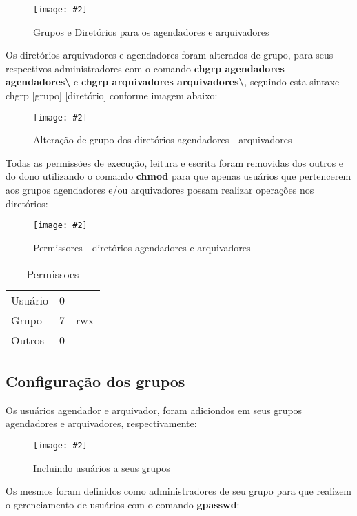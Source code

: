 \documentclass[
	12pt,				%
	openany,			%
	a4paper,			%
	chapter=TITLE,		%
	section=TITLE,		%
	english,
	brazil				%
]{abntex2}
\newcommand{\colcheted}{] }
\newcommand{\colchetee}{[}
\newcommand{\includeImage}[3] {

\begin{figure}[H]
 	 \centering
  		\texttt{[image: \#2]}
  	\caption{#3}
\end{figure}

}
\begin{document}
\includeImage{0.7}{imgs/5_gerenciamento_grupos/diretorios_grupos_arquivadores_agendadores.png}{Grupos e Diretórios para os agendadores e arquivadores}

Os diretórios arquivadores e agendadores foram alterados de grupo, para seus respectivos administradores com o comando \textbf{chgrp agendadores agendadores\textbackslash} e \textbf{chgrp arquivadores arquivadores\textbackslash}, seguindo esta sintaxe chgrp \colchetee grupo\colcheted \colchetee diretório\colcheted conforme imagem abaixo:

\includeImage{0.7}{imgs/5_gerenciamento_grupos/alteracao_de_grupo_dos_diretorios.png}{Alteração de grupo dos diretórios agendadores - arquivadores}

Todas as permissões de execução, leitura e escrita foram removidas dos outros e do dono utilizando o comando \textbf{chmod} para que apenas usuários que pertencerem aos grupos agendadores e/ou arquivadores possam realizar operações nos diretórios:

\includeImage{0.7}{imgs/5_gerenciamento_grupos/permissao_restringida_apenas_para_os_grupos.png}{Permissores - diretórios agendadores e arquivadores}

\begin{table}[h]
\caption{Permissoes}
\centering
\begin{tabular}{r|lr}
\cline{1-3}
\multicolumn{1}{|l|}{Usuário} & \multicolumn{1}{l|}{0} & \multicolumn{1}{l|}{- - -} \\ 
\cline{1-3}
\multicolumn{1}{|l|}{Grupo} & \multicolumn{1}{l|}{7} & \multicolumn{1}{l|}{rwx} \\ 
\cline{1-3}
\multicolumn{1}{|l|}{Outros} & \multicolumn{1}{l|}{0} & \multicolumn{1}{l|}{- - -} \\ 
\cline{1-3}
\end{tabular}
\end{table}

\subsection{Configuração dos grupos}

Os usuários agendador e arquivador, foram adiciondos em seus grupos agendadores e arquivadores, respectivamente:

\includeImage{0.7}{imgs/5_gerenciamento_grupos/adicionando_usuarios_aos_grupos.png}{Incluindo usuários a seus grupos}

Os mesmos foram definidos como administradores de seu grupo para que realizem o gerenciamento de usuários com o comando \textbf{gpasswd}:
\end{document}
